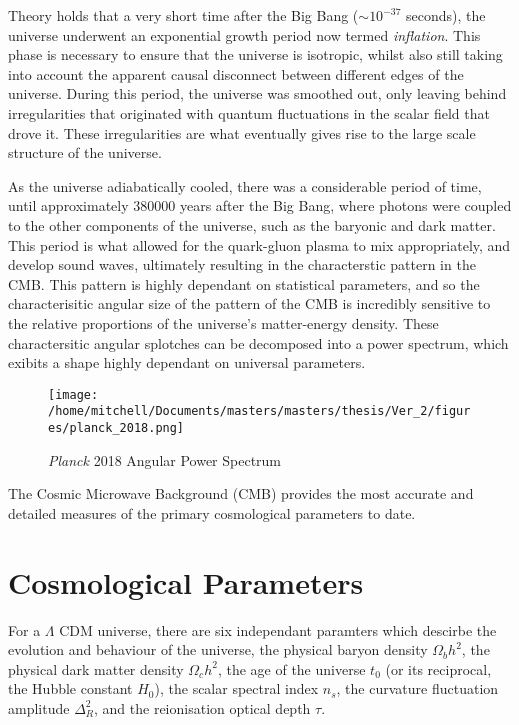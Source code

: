 Theory holds that a very short time after the Big Bang ($\sim 10^{-37}$ seconds), the universe underwent an exponential growth period now termed \textit{inflation}. This phase is necessary to ensure that the universe is isotropic, whilst also still taking into account the apparent causal disconnect between different edges of the universe. During this period, the universe was smoothed out, only leaving behind irregularities that originated with quantum fluctuations in the scalar field that drove it. These irregularities are what eventually gives rise to the large scale structure of the universe. 

As the universe adiabatically cooled, there was a considerable period of time, until approximately $380000$ years after the Big Bang, where photons were coupled to the other components of the universe, such as the baryonic and dark matter. This period is what allowed for the quark-gluon plasma to mix appropriately, and develop sound waves, ultimately resulting in the characterstic pattern in the CMB. This pattern is highly dependant on statistical parameters, and so the characterisitic angular size of the pattern of the CMB is incredibly sensitive to the relative proportions of the universe's matter-energy density. These charactersitic angular splotches can be decomposed into a power spectrum, which exibits a shape highly dependant on universal parameters.

\begin{figure}[h!]
\centering
\texttt{[image: /home/mitchell/Documents/masters/masters/thesis/Ver\_2/figures/planck\_2018.png]}
\caption{\emph{Planck} 2018 Angular Power Spectrum \citep{2018arXiv180706209P}}
\end{figure}

The Cosmic Microwave Background (CMB) provides the most accurate and detailed measures of the primary cosmological parameters to date. 

\section{Cosmological Parameters}
For a $\Lambda$ CDM universe, there are six independant paramters which descirbe the evolution and behaviour of the universe, the physical baryon density $\Omega_b h^2$, the physical dark matter density $\Omega_c h^2$, the age of the universe $t_0$ (or its reciprocal, the Hubble constant $H_0$), the scalar spectral index $n_s$, the curvature fluctuation amplitude $\Delta_R^2$, and the reionisation optical depth $\tau$. 


